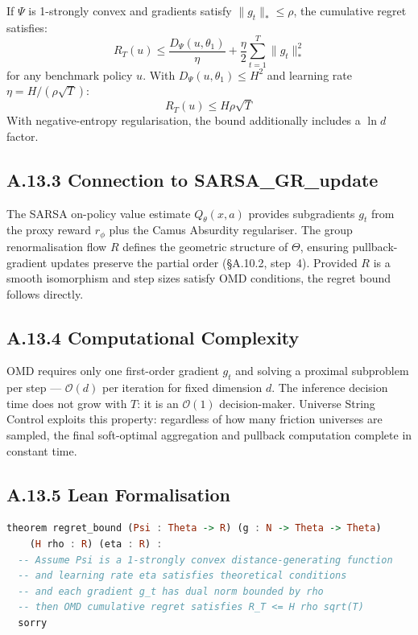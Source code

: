 \documentclass[11pt,a4paper]{article}
\theoremstyle{definition}
\theoremstyle{remark}
\begin{document}
If $\Psi$ is 1-strongly convex and gradients satisfy $\|g_t\|_* \leq \rho$, the cumulative regret satisfies:
\[
  R_T(u) \leq \frac{D_\Psi(u, \theta_1)}{\eta} + \frac{\eta}{2} \sum_{t=1}^T \|g_t\|_*^2
\]
for any benchmark policy $u$. With $D_\Psi(u, \theta_1) \leq H^2$ and learning rate $\eta = H / (\rho\sqrt{T})$:
\[
  R_T(u) \leq H\rho\sqrt{T}
\]
With negative-entropy regularisation, the bound additionally includes a $\ln d$ factor.


\subsection{A.13.3 Connection to SARSA\_GR\_update}

The SARSA on-policy value estimate $Q_\theta(x,a)$ provides subgradients $g_t$ from the proxy reward $r_\phi$ plus the Camus Absurdity regulariser. The group renormalisation flow $R$ defines the geometric structure of $\Theta$, ensuring pullback-gradient updates preserve the partial order (\S A.10.2, step~4). Provided $R$ is a smooth isomorphism and step sizes satisfy OMD conditions, the regret bound follows directly.


\subsection{A.13.4 Computational Complexity}

OMD requires only one first-order gradient $g_t$ and solving a proximal subproblem per step --- $\mathcal{O}(d)$ per iteration for fixed dimension $d$. The inference decision time does not grow with $T$: it is an $\mathcal{O}(1)$ decision-maker. Universe String Control exploits this property: regardless of how many friction universes are sampled, the final soft-optimal aggregation and pullback computation complete in constant time.


\subsection{A.13.5 Lean Formalisation}

\begin{lstlisting}[language=Haskell]
theorem regret_bound (Psi : Theta -> R) (g : N -> Theta -> Theta)
    (H rho : R) (eta : R) :
  -- Assume Psi is a 1-strongly convex distance-generating function
  -- and learning rate eta satisfies theoretical conditions
  -- and each gradient g_t has dual norm bounded by rho
  -- then OMD cumulative regret satisfies R_T <= H rho sqrt(T)
  sorry
\end{lstlisting}
\end{document}
